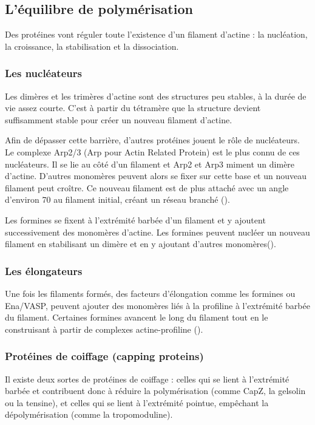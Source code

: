 \documentclass{report}
\begin{document}
\subsection{L'équilibre de polymérisation}

Des protéines vont réguler toute l'existence d'un filament d'actine : la nucléation, la croissance, la stabilisation et la dissociation. 

\subsubsection{Les nucléateurs}
Les dimères et les trimères d'actine sont des structures peu stables, à la durée de vie assez courte. C'est à partir du tétramère que la structure devient suffisamment stable pour créer un nouveau filament d'actine. 

Afin de dépasser cette barrière, d'autres protéines jouent le rôle de nucléateurs. Le complexe Arp2/3 (Arp pour Actin Related Protein) est le plus connu de ces nucléateurs. Il se lie au côté d'un filament et Arp2 et Arp3 miment un dimère d'actine. D'autres monomères peuvent alors se fixer sur cette base et un nouveau filament peut croître. Ce nouveau filament est de plus attaché avec un angle d'environ 70 \degres au filament initial, créant un réseau branché (\cite{blanchoin_direct_2000}). 

Les formines se fixent à l'extrémité barbée d'un filament et y ajoutent successivement des monomères d'actine. Les formines peuvent nucléer un nouveau filament en stabilisant un dimère et en y ajoutant d'autres monomères(\cite{pring_mechanism_2003}). 

\subsubsection{Les élongateurs}

Une fois les filaments formés, des facteurs d'élongation comme les formines ou Ena/VASP, peuvent ajouter des monomères liés à la profiline à l'extrémité barbée du filament. 
Certaines formines avancent le long du filament tout en le construisant à partir de complexes actine-profiline (\cite{otomo_structural_2005}). 


\subsubsection{Protéines de coiffage (capping proteins)}

Il existe deux sortes de protéines de coiffage : celles qui se lient à l'extrémité barbée et contribuent donc à réduire la polymérisation (comme CapZ, la gelsolin ou la tensine), et celles qui se lient à l'extrémité pointue, empêchant la dépolymérisation (comme la tropomoduline). 
\end{document}
